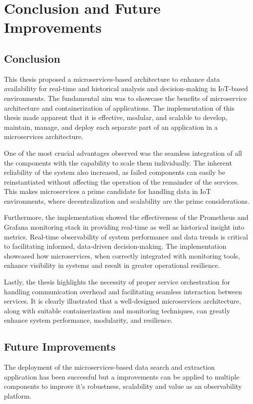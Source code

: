 \chapter{Conclusion and Future Improvements} \label{ch:conclusion}

\section{Conclusion}
This thesis proposed a microservices-based architecture to enhance data availability for real-time and historical analysis and decision-making in IoT-based environments. The fundamental aim was to showcase the benefits of microservice architecture and containerization of applications. The implementation of this thesis made apparent that it is effective, modular, and scalable to develop, maintain, manage, and deploy each separate part of an application in a microservices architecture.

One of the most crucial advantages observed was the seamless integration of all the components with the capability to scale them individually. The inherent reliability of the system also increased, as failed components can easily be reinstantiated without affecting the operation of the remainder of the services. This makes microservices a prime candidate for handling data in IoT environments, where decentralization and scalability are the prime considerations.

Furthermore, the implementation showed the effectiveness of the Prometheus and Grafana monitoring stack in providing real-time as well as historical insight into metrics. Real-time observability of system performance and data trends is critical to facilitating informed, data-driven decision-making. The implementation showcased how microservices, when correctly integrated with monitoring tools, enhance visibility in systems and result in greater operational resilience.

Lastly, the thesis highlights the necessity of proper service orchestration for handling communication overhead and facilitating seamless interaction between services. It is clearly illustrated that a well-designed microservices architecture, along with suitable containerization and monitoring techniques, can greatly enhance system performance, modularity, and resilience.

\section{Future Improvements}
The deployment of the microservices-based data search and extraction application has been successful but a improvements can be applied to multiple components to improve it's robustness, scalability and value as an observability platform.

